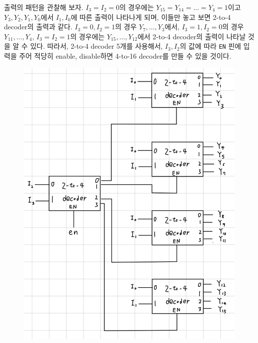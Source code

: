\documentclass{scrartcl}
\begin{document}
출력의 패턴을 관찰해 보자.
\(I_3 = I_2 = 0\)의 경우에는 \(Y_{15} = Y_{14} = \dots = Y_4 = 1\)이고 \(Y_3, Y_2, Y_1, Y_0\)에서 \(I_1, I_0\)에 따른 출력이 나타나게 되며, 이들만 놓고 보면 2-to-4 decoder의 출력과 같다.
\(I_3 = 0, I_2 = 1\)의 경우 \(Y_7, \dots, Y_3\)에서, \(I_3 = 1, I_2 = 0\)의 경우 \(Y_{11}, \dots, Y_4\), \(I_3 = I_2 = 1\)의 경우에는 \(Y_{15}, \dots, Y_{12}\)에서 2-to-4 decoder의 출력이 나타날 것을 알 수 있다.
따라서, 2-to-4 decoder 5개를 사용해서, \(I_3, I_2\)의 값에 따라 \texttt{EN} 핀에 입력을 주어 적당히 enable, disable하면 4-to-16 decoder를 만들 수 있을 것이다.
\begin{figure}[H]
  \centering
  \includegraphics[width=0.7\linewidth]{decoder_expansion}
\end{figure}
\end{document}
